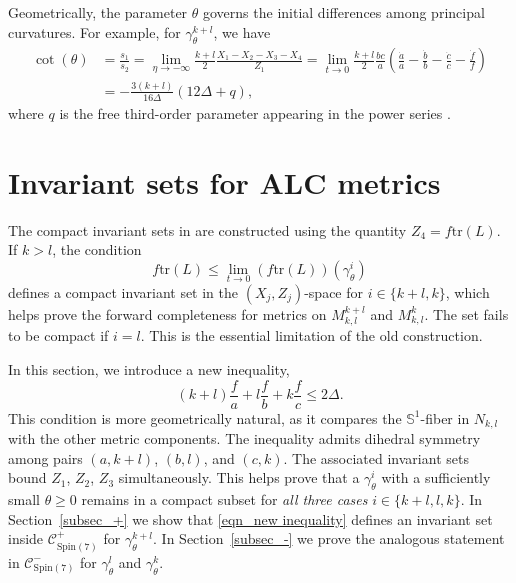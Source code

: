 \documentclass[11pt,letterpaper]{amsart}
\theoremstyle{definition}
\numberwithin{equation}{section}
\newcommand{\spin}{\mathrm{Spin}}
\begin{document}
Geometrically, the parameter $\theta$ governs the initial differences among principal curvatures. For example, for $\gamma_\theta^{k+l}$, we have 
\begin{equation}
\begin{split}
\cot(\theta)&=\frac{s_1}{s_2}=\lim\limits_{\eta\to-\infty}\frac{k+l}{2}\frac{X_1-X_2-X_3-X_4}{Z_1}=\lim\limits_{t\to 0}\frac{k+l}{2}\frac{bc}{a}\left(\frac{\dot{a}}{a}-\frac{\dot{b}}{b}-\frac{\dot{c}}{c}-\frac{\dot{f}}{f}\right)\\
&=-\frac{3(k+l)}{16\Delta}\left(12\Delta+q\right),
\end{split}
\end{equation}
where $q$ is the free third-order parameter appearing in the power series \cite[(7.1)]{reidegeld2011exceptional}.

\section{Invariant sets for ALC metrics}
\label{sec: invariant set 1}
The compact invariant sets in \cite{chi2022spin} are constructed using the quantity $Z_4=f\mathrm{tr}(L)$. If $k>l$,
the condition
$$
f\mathrm{tr}(L)\leq \lim_{t\to 0} \left(f\mathrm{tr}(L)\right)(\gamma^i_\theta)
$$
defines a compact invariant set in the $(X_j,Z_j)$-space for $i\in \{k+l,k\}$, which helps prove the forward completeness for metrics on $M_{k,l}^{k+l}$ and $M_{k,l}^{k}$. The set fails to be compact if $i=l$. This is the essential limitation of the old construction.

In this section, we introduce a new inequality,
\begin{equation}
\label{eqn_new inequality}
(k+l)\frac{f}{a}+l\frac{f}{b}+k\frac{f}{c}\leq 2\Delta.
\end{equation}
This condition is more geometrically natural, as it compares the $\mathbb{S}^1$-fiber in $N_{k,l}$ with the other metric components. The inequality admits dihedral symmetry among pairs $(a,k+l)$, $(b,l)$, and $(c,k)$. The associated invariant sets bound $Z_1$, $Z_2$, $Z_3$ simultaneously. This helps prove that a $\gamma^i_\theta$ with a sufficiently small $\theta\geq 0$ remains in a compact subset for 
\emph{all three cases} $i\in \{k+l,l,k\}$. In Section~\ref{subsec_+} we show that \eqref{eqn_new inequality} defines an invariant set inside $\mathcal{C}_{\spin(7)}^{+}$ for $\gamma^{k+l}_\theta$.  
In Section~\ref{subsec_-} we prove the analogous statement in $\mathcal{C}_{\spin(7)}^{-}$ for $\gamma^{l}_\theta$ and $\gamma^{k}_\theta$.
\end{document}
